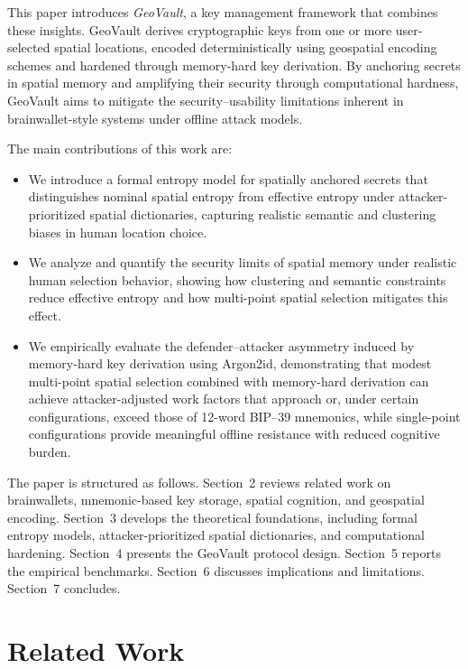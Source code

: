 \documentclass[journal,article,accept,pdftex,moreauthors]{Definitions/mdpi}
\begin{document}
This paper introduces \textit{GeoVault}, a key management framework that combines these insights. GeoVault derives cryptographic keys from one or more user-selected spatial locations, encoded deterministically using geospatial encoding schemes and hardened through memory-hard key derivation. By anchoring secrets in spatial memory and amplifying their security through computational hardness, GeoVault aims to mitigate the security--usability limitations inherent in brainwallet-style systems under offline attack models.

The main contributions of this work are:
\begin{itemize}
\item We introduce a formal entropy model for spatially anchored secrets that distinguishes nominal spatial entropy from effective entropy under attacker-prioritized spatial dictionaries, capturing realistic semantic and clustering biases in human location choice.
\item We analyze and quantify the security limits of spatial memory under realistic human selection behavior, showing how clustering and semantic constraints reduce effective entropy and how multi-point spatial selection mitigates this effect.
\item We empirically evaluate the defender--attacker asymmetry induced by memory-hard key derivation using Argon2id, demonstrating that modest multi-point spatial selection combined with memory-hard derivation can achieve attacker-adjusted work factors that approach or, under certain configurations, exceed those of 12-word BIP--39 mnemonics, while single-point configurations provide meaningful offline resistance with reduced cognitive burden.
\end{itemize}



The paper is structured as follows. Section~2 reviews related work on brainwallets, mnemonic-based key storage, spatial cognition, and geospatial encoding. Section~3 develops the theoretical foundations, including formal entropy models, attacker-prioritized spatial dictionaries, and computational hardening. Section~4 presents the GeoVault protocol design. Section~5 reports the empirical benchmarks. Section~6 discusses implications and limitations. Section~7 concludes.

\section{Related Work}
\end{document}
